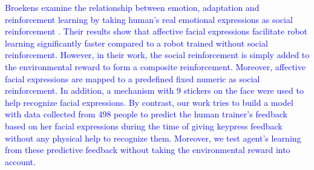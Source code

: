 \textcolor{blue}{Broekens examine the relationship between emotion, adaptation and reinforcement learning by taking human's real emotional expressions as social reinforcement \cite{broekens2007emotion}. Their results show that affective facial expressions facilitate robot learning significantly faster compared to a robot trained without social reinforcement.  %
However, in their work, the social reinforcement is simply added to the environmental reward to form a composite reinforcement. Moreover, %
affective facial expressions are mapped to a predefined fixed numeric as social reinforcement. In addition, a mechanism with 9 stickers on the face were used to help recognize facial expressions. By contrast, our work tries to build a model with data collected from 498 people to predict the human trainer's feedback based on her facial expressions during the time of giving keypress feedback without any physical help to recognize them. Moreover, we test %
agent's learning from these predictive feedback %
without taking the environmental reward into account.}%

